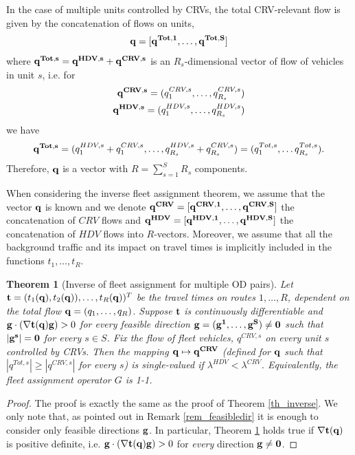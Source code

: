 \documentclass[a4paper,11pt]{article}
\newtheorem{theorem}{Theorem}
\begin{document}
In the case of multiple units controlled by CRVs, the total CRV-relevant flow is given by the concatenation of flows on units,
\begin{equation*}
\bold{q} = [\bold{q^{Tot, 1}}, \dots, \bold{q^{Tot, S}}]
\end{equation*}
where $\bold{q^{Tot, s}} = \bold{q^{HDV,s}} + \bold{q^{CRV,s}}$ is an $R_s$-dimensional vector of flow of vehicles in unit $s$, i.e. for 
\begin{eqnarray*}
\bold{q^{CRV,s}} = (q^{CRV,s}_1, \dots, q^{CRV,s}_{R_s})\\
\bold{q^{HDV,s}} = (q^{HDV,s}_1, \dots, q^{HDV,s}_{R_s})
\end{eqnarray*}
we have 
\begin{equation*}
\bold{q^{Tot,s}} = (q^{HDV,s}_1 + q^{CRV,s}_1, \dots, q^{HDV,s}_{R_s} + q^{CRV,s}_{R_s}) = ({q^{Tot,s}_1}, \dots {q^{Tot,s}_{R_s}}).
\end{equation*}
\noindent Therefore, $\bold{q}$ is a vector with $R = \sum_{s=1}^S R_s$ components. 

When considering the inverse fleet assignment theorem, we assume that the vector $\bold{q}$ is known and we denote $\bold{q^{CRV}} = [\bold{q^{CRV,1}}, \dots, \bold{q^{CRV,S}}]$ the concatenation of $CRV$ flows and $\bold{q^{HDV}} = [\bold{q^{HDV,1}}, \dots, \bold{q^{HDV,S}}]$ the concatenation of $HDV$ flows into $R$-vectors. Moreover, we assume that all the background traffic and its impact on travel times is implicitly included in the functions $t_1, \dots, t_R$. 


\begin{theorem}[Inverse of fleet assignment for multiple OD pairs]
\label{th_generalize}
Let $\bold{t} = (t_1(\bold{q}), t_2(\bold{q})), \dots, t_R(\bold{q}))^T$ be the travel times on routes $1,\dots, R$, dependent on the total flow $\bold{q} = (q_1, \dots, q_R)$. 
Suppose $\bold{t}$ is continuously differentiable and $\bold{g}\cdot (\nabla \bold{t(q)}\bold{g})>0$ for every feasible direction $\bold{g} = (\bold{g^1}, \dots, \bold{g^S})\neq \bold{0}$ such that $|\bold{g^s}| = \bold{0}$ for every $s \in S$. Fix the flow of fleet vehicles, $q^{CRV,s}$ on every unit $s$ controlled by CRVs.  Then the mapping $\bold{q} \mapsto \bold{q^{CRV}}$ (defined for $\bold{q}$ such that $|q^{Tot,s}|\ge |q^{CRV,s}|$ for every $s$) is single-valued if $\lambda^{HDV} <  \lambda^{CRV}$. Equivalently, the fleet assignment operator $G$ is 1-1. 
\end{theorem}
\begin{proof}
The proof is exactly the same as the proof of Theorem \ref{th_inverse}. We only note that, as pointed out in Remark \ref{rem_feasibledir} it is enough to consider only feasible directions $\bold{g}$. In particular, Theorem \ref{th_generalize} holds true if $\nabla \bold{t(q)}$ is positive definite, i.e. $\bold{g}\cdot (\nabla \bold{t(q)}\bold{g})>0$ for \emph{every} direction $\bold{g} \neq \bold{0}$. 
\end{proof}
\end{document}
